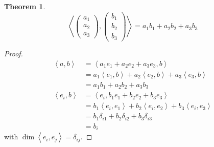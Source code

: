 \documentclass[a4paper,landscape,twocolumn]{article}
\newcommand\functional[1]{\left\langle{#1}\right\rangle}
\theoremstyle{definition}
\newtheorem{theorem}{Theorem}
\begin{document}
\begin{theorem}
  \label{satz-8.4}
  \[ \functional{\begin{pmatrix} a_1 \\ a_2 \\ a_3 \end{pmatrix}, \begin{pmatrix} b_1 \\ b_2 \\ b_3 \end{pmatrix}} = a_1 b_1 + a_2 b_2 + a_3 b_3 \]
\end{theorem}
\begin{proof}
  \begin{align*}
    \functional{a,b} &= \functional{a_1 e_1 + a_2 e_2 + a_3 e_3, b} \\
      &= a_1 \functional{e_1, b} + a_2 \functional{e_2, b} + a_3 \functional{e_3, b} \\
      &= a_1 b_1 + a_2 b_2 + a_3 b_3 \\
    \functional{e_i,b}
      &= \functional{e_i, b_1 e_1 + b_2 e_2 + b_3 e_3} \\
      &= b_1 \functional{e_i, e_1} + b_2 \functional{e_i, e_2} + b_3 \functional{e_i, e_3} \\
      &= b_1 \delta_{i1} + b_2 \delta_{i2} + b_3 \delta_{i3} \\
      &= b_i
  \end{align*}
  with $\dim\functional{e_i,e_j} = \delta_{ij}$.
\end{proof}
\end{document}
